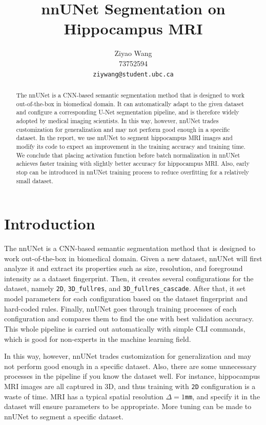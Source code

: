 \documentclass{article}
\title{nnUNet Segmentation on Hippocampus MRI}
\author{
  Ziyao Wang\\
  73752594\\
  \texttt{ziywang@student.ubc.ca} \\
}
\begin{document}
\maketitle

\begin{abstract}
  The nnUNet is a CNN-based semantic segmentation method that is designed to work out-of-the-box in biomedical domain. It can automatically adapt to the given dataset and configure a corresponding U-Net segmentation pipeline, and is therefore widely adopted by medical imaging scientists. In this way, however, nnUNet trades customization for generalization and may not perform good enough in a specific dataset. In the report, we use nnUNet to segment hippocampus MRI images and modify its code to expect an improvement in the training accuracy and training time. We conclude that placing activation function before batch normalization in nnUNet achieves faster training with slightly better accuracy for hippocampus MRI. Also, early stop can be introduced in nnUNet training process to reduce overfitting for a relatively small dataset.
\end{abstract}


\section{Introduction}

The nnUNet is a CNN-based semantic segmentation method that is designed to work out-of-the-box in biomedical domain. Given a new dataset, nnUNet will first analyze it and extract its properties such as size, resolution, and foreground intensity as a dataset fingerprint. Then, it creates several configurations for the dataset, namely \texttt{2D}, \texttt{3D\_fullres}, and \texttt{3D\_fullres\_cascade}. After that, it set model parameters for each configuration based on the dataset fingerprint and hard-coded rules. Finally, nnUNet goes through training processes of each configuration and compares them to find the one with best validation accuracy. This whole pipeline is carried out automatically with simple CLI commands, which is good for non-experts in the machine learning field.

In this way, however, nnUNet trades customization for generalization and may not perform good enough in a specific dataset. Also, there are some unnecessary processes in the pipeline if you know the dataset well. For instance, hippocampus MRI images are all captured in 3D, and thus training with \texttt{2D} configuration is a waste of time. MRI has a typical spatial resolution \(\Delta=1\)\texttt{mm}, and specify it in the dataset will ensure parameters to be appropriate. More tuning can be made to nnUNet to segment a specific dataset.
\end{document}
